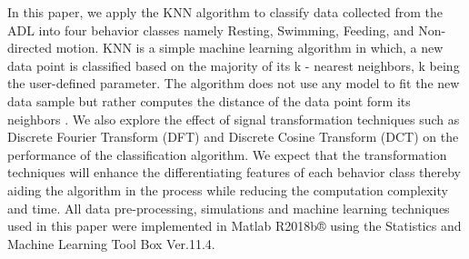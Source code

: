 \documentclass[conference]{IEEEtran}
\begin{document}
In this paper, we apply the KNN algorithm to classify data collected from the ADL into four behavior classes namely Resting, Swimming, Feeding, and Non-directed motion. KNN is a simple machine learning algorithm in which, a new data point is classified based on the majority of its k - nearest neighbors, k being the user-defined parameter. The algorithm does not use any model to fit the new data sample but rather computes the distance of the data point form its neighbors  \cite{7}. We also explore the effect of signal transformation techniques such as Discrete Fourier Transform (DFT) and Discrete Cosine Transform (DCT) on the performance of the classification algorithm. We expect that the transformation techniques will enhance the differentiating features of each behavior class thereby aiding the algorithm in the process while reducing the computation complexity and time. All data pre-processing, simulations and machine learning techniques used in this paper were implemented in Matlab R2018b® using the Statistics and Machine Learning Tool Box Ver.11.4.
\end{document}
